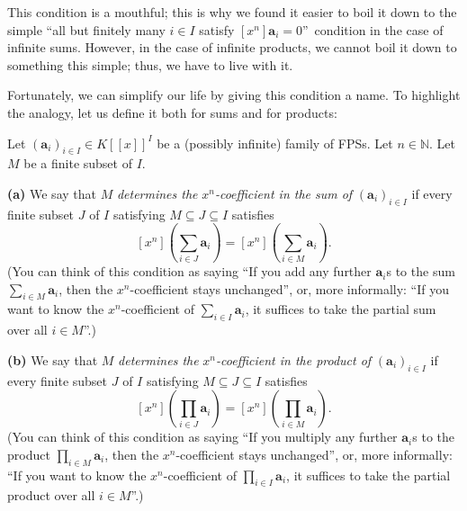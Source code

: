 This condition is a mouthful; this is why we found it easier to boil it down
to the simple \textquotedblleft all but finitely many $i\in I$ satisfy
$\left[  x^{n}\right]  \mathbf{a}_{i}=0$\textquotedblright\ condition in the
case of infinite sums. However, in the case of infinite products, we cannot
boil it down to something this simple; thus, we have to live with it.

Fortunately, we can simplify our life by giving this condition a name. To
highlight the analogy, let us define it both for sums and for products:

\begin{definition}
\label{def.fps.determines-xn-coeff}Let $\left(  \mathbf{a}_{i}\right)  _{i\in
I}\in K\left[  \left[  x\right]  \right]  ^{I}$ be a (possibly infinite)
family of FPSs. Let $n\in\mathbb{N}$. Let $M$ be a finite subset of $I$.
\medskip

\textbf{(a)} We say that $M$ \emph{determines the }$x^{n}$\emph{-coefficient
in the sum of }$\left(  \mathbf{a}_{i}\right)  _{i\in I}$ if every finite
subset $J$ of $I$ satisfying $M\subseteq J\subseteq I$ satisfies%
\[
\left[  x^{n}\right]  \left(  \sum_{i\in J}\mathbf{a}_{i}\right)  =\left[
x^{n}\right]  \left(  \sum_{i\in M}\mathbf{a}_{i}\right)  .
\]
(You can think of this condition as saying \textquotedblleft If you add any
further $\mathbf{a}_{i}$s to the sum $\sum_{i\in M}\mathbf{a}_{i}$, then the
$x^{n}$-coefficient stays unchanged\textquotedblright, or, more informally:
\textquotedblleft If you want to know the $x^{n}$-coefficient of $\sum_{i\in
I}\mathbf{a}_{i}$, it suffices to take the partial sum over all $i\in
M$\textquotedblright.) \medskip

\textbf{(b)} We say that $M$ \emph{determines the }$x^{n}$\emph{-coefficient
in the product of }$\left(  \mathbf{a}_{i}\right)  _{i\in I}$ if every finite
subset $J$ of $I$ satisfying $M\subseteq J\subseteq I$ satisfies%
\[
\left[  x^{n}\right]  \left(  \prod_{i\in J}\mathbf{a}_{i}\right)  =\left[
x^{n}\right]  \left(  \prod_{i\in M}\mathbf{a}_{i}\right)  .
\]
(You can think of this condition as saying \textquotedblleft If you multiply
any further $\mathbf{a}_{i}$s to the product $\prod_{i\in M}\mathbf{a}_{i}$,
then the $x^{n}$-coefficient stays unchanged\textquotedblright, or, more
informally: \textquotedblleft If you want to know the $x^{n}$-coefficient of
$\prod_{i\in I}\mathbf{a}_{i}$, it suffices to take the partial product over
all $i\in M$\textquotedblright.)
\end{definition}

